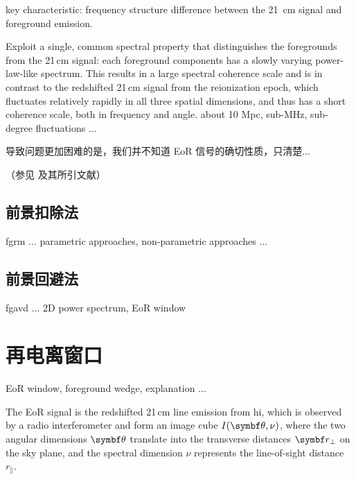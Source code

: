 key characteristic: frequency structure difference between
the 21~cm signal and foreground emission.

Exploit a single, common spectral property that distinguishes the
foregrounds from the 21\,cm signal: each foreground components has
a slowly varying power-law-like spectrum.
This results in a large spectral coherence scale and is in contrast
to the redshifted 21\,cm signal from the reionization epoch, which
fluctuates relatively rapidly in all three spatial dimensions, and
thus has a short coherence scale, both in frequency and angle.
about 10 Mpc, sub-MHz, sub-degree fluctuations ...
\cite{morales2004,bowman2009}

导致问题更加困难的是，我们并不知道 EoR 信号的确切性质，只清楚...

（参见  及其所引文献）

\subsection{前景扣除法}
\label{sec:fgrm}

\ac{fgrm} ...
parametric approaches, non-parametric approaches ...

\subsection{前景回避法}
\label{sec:fgavd}

\ac{fgavd} ...
2D power spectrum, EoR window


\section{再电离窗口}
\label{sec:eor-window}

EoR window, foreground wedge, explanation ...

The EoR signal is the redshifted 21\,cm line emission from \ac{hi},
which is observed by a radio interferometer and form an image cube
$I(\B{\theta}, \nu)$, where the two angular dimensions $\B{\theta}$
translate into the transverse distances $\B{r}_{\bot}$ on the sky plane,
and the spectral dimension $\nu$ represents the line-of-sight distance
$r_{\parallel}$.

